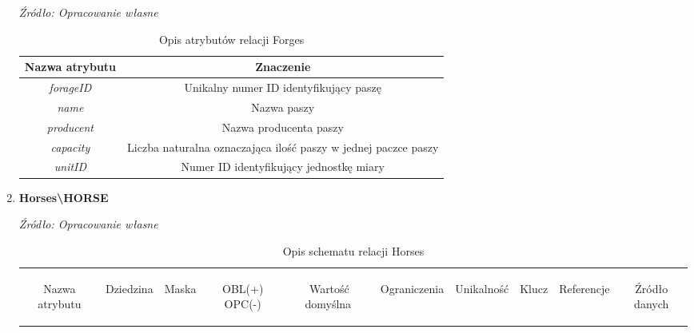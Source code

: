 \documentclass[12pt,twoside]{report}
\begin{document}
\begin{enumerate}[start=1,label={\bfseries REL\textbackslash0\arabic*}]
\begin{table}[H]
	\caption{Opis atrybutów relacji Forges}
	\textit{Źródło: Opracowanie własne}
	\label{ForgesAttributeDescription}
	\centering
	\begin{tabular}{|c|c|}
		\hline
		Nazwa atrybutu & Znaczenie \\
		\hline
		\textit{forageID}&Unikalny numer ID identyfikujący paszę\\		
		\hline		
		\textit{name}&Nazwa paszy\\		
		\hline
		\textit{producent}&Nazwa producenta paszy\\		
		\hline		
		\textit{capacity}&Liczba naturalna oznaczająca ilość paszy w jednej paczce paszy\\		
		\hline
		\textit{unitID}& Numer ID identyfikujący jednostkę miary\\
		\hline
	\end{tabular}
\end{table}
\item \textbf{Horses\textbackslash HORSE} 
\begin{table}[H]
	\caption{Opis schematu relacji Horses}
	\textit{Źródło: Opracowanie własne}
	\label{HorsesRelationSchema}
	\centering
	\begin{tabular}{|c|c|c|c|c|c|c|c|c|c|}
		\hline
		\begin{sideways}Nazwa atrybutu\end{sideways}& 
		\begin{sideways}Dziedzina \end{sideways}& 
		\begin{sideways}Maska \end{sideways}& 
		\begin{sideways}OBL(+) OPC(-)\end{sideways} & 
		\begin{sideways}Wartość domyślna$\ $\end{sideways}& 
		\begin{sideways}Ograniczenia\end{sideways} &
		\begin{sideways}Unikalność \end{sideways}& 
		\begin{sideways}Klucz \end{sideways}& 
		\begin{sideways}Referencje \end{sideways}&
		\begin{sideways}Źródło danych\end{sideways}\\

\end{tabular}
\end{table}
\end{enumerate}
\end{document}
